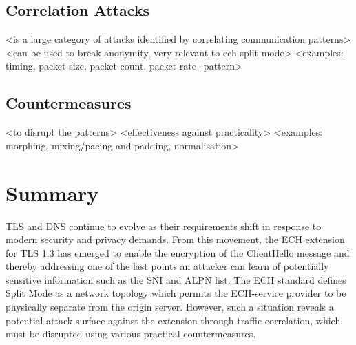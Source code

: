 \subsection{Correlation Attacks}

<is a large category of attacks identified by correlating communication patterns>
<can be used to break anonymity, very relevant to ech split mode>
<examples: timing, packet size, packet count, packet rate+pattern>

\subsection{Countermeasures}

<to disrupt the patterns>
<effectiveness against practicality>
<examples: morphing, mixing/pacing and padding, normalisation>








\section{Summary}

TLS and DNS continue to evolve as their requirements shift in response to modern security and privacy demands. From this movement, the ECH extension for TLS 1.3 has emerged to enable the encryption of the ClientHello message and thereby addressing one of the last points an attacker can learn of potentially sensitive information such as the SNI and ALPN list. The ECH standard defines Split Mode as a network topology which permits the ECH-service provider to be physically separate from the origin server. However, such a situation reveals a potential attack surface against the extension through traffic correlation, which must be disrupted using various practical countermeasures.
